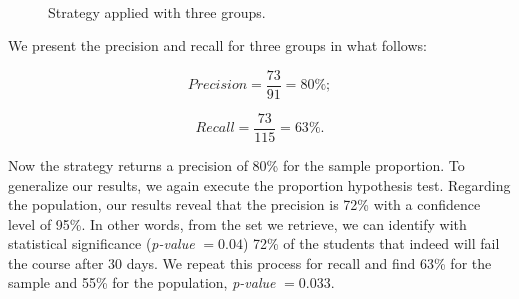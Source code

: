\begin{figure}[ht]
\begin{center}
{             \label{fig:3-2013-01}
         }\\
     \end{center}
     \caption{Strategy applied with three groups.}
	 \label{fig:3-groups}
\end{figure}

We present the precision and recall for three groups in what follows:

\vspace{0.2cm}
\noindent
\begin{minipage}{.5\linewidth}
\centering
$$
Precision = \frac{73}{91} = 80\%;
$$
\end{minipage}
\begin{minipage}{.5\linewidth}
$$
Recall = \frac{73}{115} = 63\%.
$$
\end{minipage}
\vspace{0.2cm}

Now the strategy returns a precision of 80\% for the sample proportion. To generalize our results, we again execute the proportion hypothesis test. Regarding the population, our results reveal that the precision is 72\% with a confidence level of 95\%. In other words, from the set we retrieve,  we can identify with statistical significance (\textit{p-value} $= 0.04$) 72\% of the students that indeed will fail the course after 30 days. We repeat this process for recall and find 63\% for the sample and 55\% for the population, \textit{p-value} $= 0.033$.

